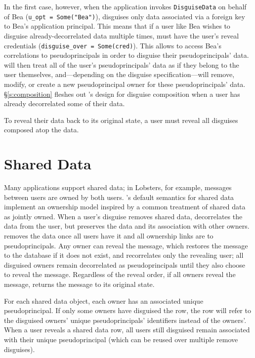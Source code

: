 In the first case, however, when the application invokes \texttt{DisguiseData}
on behalf of Bea (\texttt{u\_opt = Some("Bea")}), \sys disguises only data
associated via a foreign key to Bea's application principal.
%
This means that if a user like Bea wishes to disguise already-decorrelated data
multiple times, \sys must have the user's reveal credentials
(\texttt{disguise\_over = Some(cred)}). This allows \sys to access Bea's
correlations to pseudoprincipals in order to disguise their pseudoprincipals'
data.
%
\sys will then treat all of the user's pseudoprincipals' data as if they belong
to the user themselves, and---depending on the disguise specification---will
remove, modify, or create a new pseudoprincipal owner for these
pseudoprincipals' data.
%
\S\ref{s:composition} fleshes out \sys's design for disguise composition when
a user has already decorrelated some of their data.

%
To reveal their data back to its original state, a user must reveal all
disguises composed atop the data.
%

\section{Shared Data}
Many applications support shared data; in Lobsters, for example, messages
between users are owned by both users.
%
\sys's default semantics for shared data implement an ownership model inspired
by a common treatment of shared data as jointly owned.
%
When a user's disguise removes shared data, \sys decorrelates the data from the
\xxing user, but preserves the data and its association with other owners.
%
\sys removes the data once all users have \xxed it and all ownership links are
to pseudoprincipals.
%
Any owner can reveal the message, which restores the message to the database if
it does not exist, and recorrelates only the revealing user; all disguised
owners remain decorrelated as pseudoprincipals until they also choose to reveal
the message.
%
Regardless of the reveal order, if all owners reveal the message, \sys returns
the message to its original state.
%

%
For each shared data object, each owner has an associated unique
pseudoprincipal. If only some owners have disguised the row, the row will refer
to the disguised owners' unique pseudoprincipals' identifiers instead of the
owners'.
%
When a user reveals a shared data row, all users still disguised remain
associated with their unique pseudoprincipal (which can be reused over multiple
remove disguises).
%

